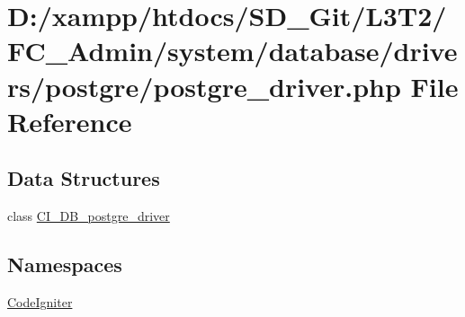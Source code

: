 \hypertarget{_admin_2system_2database_2drivers_2postgre_2postgre__driver_8php}{}\section{D\+:/xampp/htdocs/\+S\+D\+\_\+\+Git/\+L3\+T2/\+F\+C\+\_\+\+Admin/system/database/drivers/postgre/postgre\+\_\+driver.php File Reference}
\label{_admin_2system_2database_2drivers_2postgre_2postgre__driver_8php}
\subsection*{Data Structures}
\begin{DoxyCompactItemize}
\item 
class \hyperlink{class_c_i___d_b__postgre__driver}{C\+I\+\_\+\+D\+B\+\_\+postgre\+\_\+driver}
\end{DoxyCompactItemize}
\subsection*{Namespaces}
\begin{DoxyCompactItemize}
\item 
 \hyperlink{namespace_code_igniter}{Code\+Igniter}
\end{DoxyCompactItemize}
